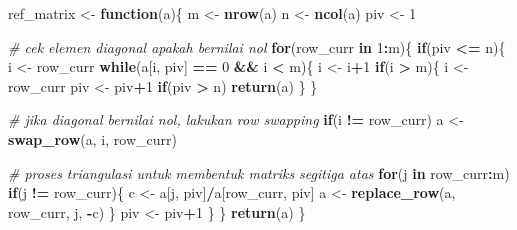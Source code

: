 \documentclass[
]{book}
\newenvironment{Shaded}{\begin{snugshade}}{\end{snugshade}}
\newcommand{\CommentTok}[1]{\textcolor[rgb]{0.56,0.35,0.01}{\textit{#1}}}
\newcommand{\ControlFlowTok}[1]{\textcolor[rgb]{0.13,0.29,0.53}{\textbf{#1}}}
\newcommand{\DecValTok}[1]{\textcolor[rgb]{0.00,0.00,0.81}{#1}}
\newcommand{\FunctionTok}[1]{\textcolor[rgb]{0.13,0.29,0.53}{\textbf{#1}}}
\newcommand{\NormalTok}[1]{#1}
\newcommand{\OtherTok}[1]{\textcolor[rgb]{0.56,0.35,0.01}{#1}}
\newcommand{\SpecialCharTok}[1]{\textcolor[rgb]{0.81,0.36,0.00}{\textbf{#1}}}
\theoremstyle{definition}
\theoremstyle{definition}
\theoremstyle{definition}
\theoremstyle{definition}
\theoremstyle{remark}
\begin{document}
\begin{Shaded}
\begin{Highlighting}[]
\NormalTok{ref\_matrix }\OtherTok{\textless{}{-}} \ControlFlowTok{function}\NormalTok{(a)\{}
\NormalTok{  m }\OtherTok{\textless{}{-}} \FunctionTok{nrow}\NormalTok{(a)}
\NormalTok{  n }\OtherTok{\textless{}{-}} \FunctionTok{ncol}\NormalTok{(a)}
\NormalTok{  piv }\OtherTok{\textless{}{-}} \DecValTok{1}
  
\CommentTok{\# cek elemen diagonal apakah bernilai nol}
  \ControlFlowTok{for}\NormalTok{(row\_curr }\ControlFlowTok{in} \DecValTok{1}\SpecialCharTok{:}\NormalTok{m)\{}
    \ControlFlowTok{if}\NormalTok{(piv }\SpecialCharTok{\textless{}=}\NormalTok{ n)\{}
\NormalTok{      i }\OtherTok{\textless{}{-}}\NormalTok{ row\_curr}
      \ControlFlowTok{while}\NormalTok{(a[i, piv] }\SpecialCharTok{==} \DecValTok{0} \SpecialCharTok{\&\&}\NormalTok{ i }\SpecialCharTok{\textless{}}\NormalTok{ m)\{}
\NormalTok{        i }\OtherTok{\textless{}{-}}\NormalTok{ i}\SpecialCharTok{+}\DecValTok{1}
        \ControlFlowTok{if}\NormalTok{(i }\SpecialCharTok{\textgreater{}}\NormalTok{ m)\{}
\NormalTok{          i }\OtherTok{\textless{}{-}}\NormalTok{ row\_curr}
\NormalTok{          piv }\OtherTok{\textless{}{-}}\NormalTok{ piv}\SpecialCharTok{+}\DecValTok{1}
          \ControlFlowTok{if}\NormalTok{(piv }\SpecialCharTok{\textgreater{}}\NormalTok{ n)}
            \FunctionTok{return}\NormalTok{(a)}
\NormalTok{        \}}
\NormalTok{      \}}
      
\CommentTok{\# jika diagonal bernilai nol, lakukan row swapping}
    \ControlFlowTok{if}\NormalTok{(i }\SpecialCharTok{!=}\NormalTok{ row\_curr)}
\NormalTok{      a }\OtherTok{\textless{}{-}} \FunctionTok{swap\_row}\NormalTok{(a, i, row\_curr)}
    
\CommentTok{\# proses triangulasi untuk membentuk matriks segitiga atas}
    \ControlFlowTok{for}\NormalTok{(j }\ControlFlowTok{in}\NormalTok{ row\_curr}\SpecialCharTok{:}\NormalTok{m)}
      \ControlFlowTok{if}\NormalTok{(j }\SpecialCharTok{!=}\NormalTok{ row\_curr)\{}
\NormalTok{        c }\OtherTok{\textless{}{-}}\NormalTok{ a[j, piv]}\SpecialCharTok{/}\NormalTok{a[row\_curr, piv]}
\NormalTok{        a }\OtherTok{\textless{}{-}} \FunctionTok{replace\_row}\NormalTok{(a, row\_curr, j, }\SpecialCharTok{{-}}\NormalTok{c)}
\NormalTok{      \}}
\NormalTok{    piv }\OtherTok{\textless{}{-}}\NormalTok{ piv}\SpecialCharTok{+}\DecValTok{1}
\NormalTok{    \}}
\NormalTok{  \}}
  \FunctionTok{return}\NormalTok{(a)}
\NormalTok{\}}
\end{Highlighting}
\end{Shaded}
\end{document}
